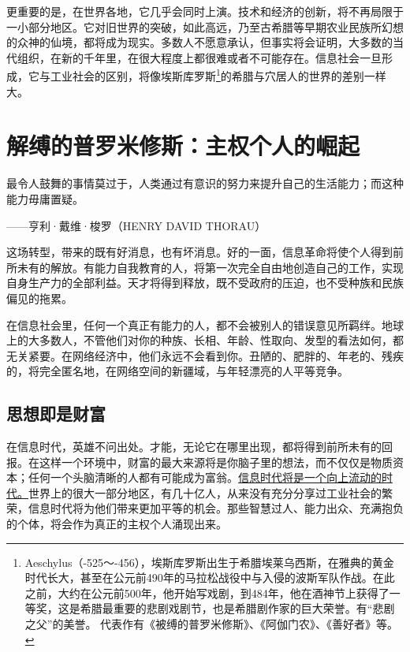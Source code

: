 更重要的是，在世界各地，它几乎会同时上演。技术和经济的创新，将不再局限于一小部分地区。它对旧世界的突破，如此高远，乃至古希腊等早期农业民族所幻想的众神的仙境，都将成为现实。多数人不愿意承认，但事实将会证明，大多数的当代组织，在新的千年里，在很大程度上都很难或者不可能存在。信息社会一旦形成，它与工业社会的区别，将像埃斯库罗斯\footnote{Aeschylus（-525～-456），埃斯库罗斯出生于希腊埃莱乌西斯，在雅典的黄金时代长大，甚至在公元前490年的马拉松战役中与入侵的波斯军队作战。在此之前，大约在公元前500年，他开始写戏剧，到484年，他在酒神节上获得了一等奖，这是希腊最重要的悲剧戏剧节，也是希腊剧作家的巨大荣誉。有“悲剧之父”的美誉。 代表作有《被缚的普罗米修斯》、《阿伽门农》、《善好者》等。}的希腊与穴居人的世界的差别一样大。

\section{解缚的普罗米修斯：主权个人的崛起}

\begin{tcolorbox}
\kaishu 最令人鼓舞的事情莫过于，人类通过有意识的努力来提升自己的生活能力；而这种能力毋庸置疑。
\begin{flushright}
——亨利·戴维·梭罗（HENRY DAVID THORAU）
\end{flushright}
\end{tcolorbox}

这场转型，带来的既有好消息，也有坏消息。好的一面，信息革命将使个人得到前所未有的解放。有能力自我教育的人，将第一次完全自由地创造自己的工作，实现自身生产力的全部利益。天才将得到释放，既不受政府的压迫，也不受种族和民族偏见的拖累。


在信息社会里，任何一个真正有能力的人，都不会被别人的错误意见所羁绊。地球上的大多数人，不管他们对你的种族、长相、年龄、性取向、发型的看法如何，都无关紧要。在网络经济中，他们永远不会看到你。丑陋的、肥胖的、年老的、残疾的，将完全匿名地，在网络空间的新疆域，与年轻漂亮的人平等竞争。

\subsection{思想即是财富}

在信息时代，英雄不问出处。才能，无论它在哪里出现，都将得到前所未有的回报。在这样一个环境中，财富的最大来源将是你脑子里的想法，而不仅仅是物质资本；任何一个头脑清晰的人都有可能成为富翁。\uline{信息时代将是一个向上流动的时代。}世界上的很大一部分地区，有几十亿人，从来没有充分分享过工业社会的繁荣，信息时代将为他们带来更加平等的机会。那些智慧过人、能力出众、充满抱负的个体，将会作为真正的主权个人涌现出来。

